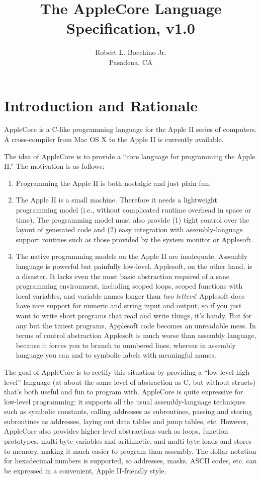 \documentclass[10pt]{article}
\title{\bfseries{The AppleCore Language Specification, v1.0}}
\author{Robert L. Bocchino Jr.\\
Pasadena, CA}
\begin{document}
\maketitle

\tableofcontents

\section{Introduction and Rationale}

AppleCore is a C-like programming language for the Apple II series of
computers.  A cross-compiler from Mac OS X to the Apple II is
currently available.

The idea of AppleCore is to provide a ``core language for programming
the Apple II.''  The motivation is as follows:
%
\begin{enumerate}
%
\item Programming the Apple II is both nostalgic and just plain fun.
%
\item The Apple II is a small machine.  Therefore it needs a
  lightweight programming model (i.e., without complicated runtime
  overhead in space or time).  The programming model must also provide
  (1) tight control over the layout of generated code and (2) easy
  integration with assembly-language support routines such as those
  provided by the system monitor or Applesoft.
%
\item The native programming models on the Apple II are inadequate.
  Assembly language is powerful but painfully low-level.  Applesoft,
  on the other hand, is a disaster.  It lacks even the most basic
  abstraction required of a sane programming environment, including
  scoped loops, scoped functions with local variables, and variable
  names longer than \emph{two letters}!  Applesoft does have nice
  support for numeric and string input and output, so if you just want
  to write short programs that read and write things, it's handy. But
  for any but the tiniest programs, Applesoft code becomes an
  unreadable mess.  In terms of control abstraction Applesoft is much
  worse than assembly language, because it forces you to branch to
  numbered lines, whereas in assembly language you can  and
   to symbolic labels with meaningful names.
%
\end{enumerate}

The goal of AppleCore is to rectify this situation by providing a
``low-level high-level'' language (at about the same level of
abstraction as C, but without structs) that's both useful and fun to
program with.  AppleCore is quite expressive for low-level
programming: it supports all the usual assembly-language techniques
such as symbolic constants, calling addresses as subroutines, passing
and storing subroutines as addresses, laying out data tables and jump
tables, etc.  However, AppleCore also provides higher-level
abstractions such as loops, function prototypes, multi-byte variables
and arithmetic, and multi-byte loads and stores to memory, making it
much easier to program than assembly.  The dollar notation for
hexadecimal numbers is supported, so addresses, masks, ASCII codes,
etc. can be expressed in a convenient, Apple II-friendly style.
\end{document}
